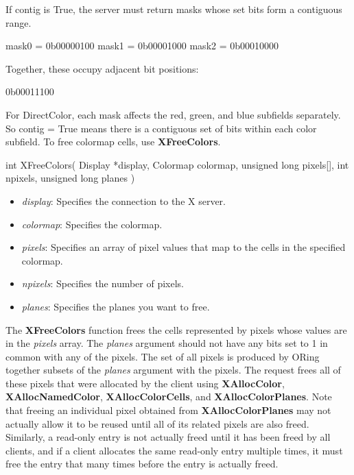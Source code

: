\documentclass{report}
\begin{document}
\begin{itemize}
            \bigbreak \noindent 
            If contig is True, the server must return masks whose set bits form a contiguous range.
            \bigbreak \noindent 
            \begin{cppcode}
                mask0 = 0b00000100
                mask1 = 0b00001000
                mask2 = 0b00010000
            \end{cppcode}
            Together, these occupy adjacent bit positions:
            \bigbreak \noindent 
            \begin{cppcode}
            0b00011100
            \end{cppcode}
            \bigbreak \noindent 
            For DirectColor, each mask affects the red, green, and blue subfields separately. So contig = True means there is a contiguous set of bits within each color subfield.
            \bigbreak \noindent 
            To free colormap cells, use \textbf{XFreeColors}.
            \bigbreak \noindent 
            \begin{cppcode}
                int XFreeColors(
                    Display *display,
                    Colormap colormap,
                    unsigned long pixels[],
                    int npixels,
                    unsigned long planes
                )
            \end{cppcode}
            \begin{itemize}
                \item \textit{display}: Specifies the connection to the X server.
                \item \textit{colormap}: Specifies the colormap.
                \item \textit{pixels}: Specifies an array of pixel values that map to the cells in the specified colormap.
                \item \textit{npixels}: Specifies the number of pixels.
                \item \textit{planes}: Specifies the planes you want to free.
            \end{itemize}
            \noindent
            The \textbf{XFreeColors} function frees the cells represented by pixels whose values are in the \textit{pixels} array. The \textit{planes} argument should not have any bits set to 1 in common with any of the pixels. The set of all pixels is produced by ORing together subsets of the \textit{planes} argument with the pixels.
            \bigbreak \noindent
            The request frees all of these pixels that were allocated by the client using \textbf{XAllocColor}, \textbf{XAllocNamedColor}, \textbf{XAllocColorCells}, and \textbf{XAllocColorPlanes}. Note that freeing an individual pixel obtained from \textbf{XAllocColorPlanes} may not actually allow it to be reused until all of its related pixels are also freed. Similarly, a read-only entry is not actually freed until it has been freed by all clients, and if a client allocates the same read-only entry multiple times, it must free the entry that many times before the entry is actually freed.

\end{itemize}
\end{document}
